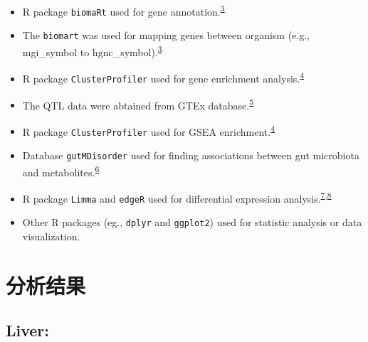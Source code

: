\documentclass[
]{article}
\providecommand{\tightlist}{%
  \setlength{\itemsep}{0pt}\setlength{\parskip}{0pt}}
\begin{document}
\begin{itemize}
\tightlist
\item
  R package \texttt{biomaRt} used for gene annotation.\textsuperscript{\protect\hyperlink{ref-MappingIdentifDurinc2009}{3}}
\item
  The \texttt{biomart} was used for mapping genes between organism (e.g., mgi\_symbol to hgnc\_symbol).\textsuperscript{\protect\hyperlink{ref-MappingIdentifDurinc2009}{3}}
\item
  R package \texttt{ClusterProfiler} used for gene enrichment analysis.\textsuperscript{\protect\hyperlink{ref-ClusterprofilerWuTi2021}{4}}
\item
  The QTL data were abtained from GTEx database.\textsuperscript{\protect\hyperlink{ref-TheGtexConsorNone2020}{5}}
\item
  R package \texttt{ClusterProfiler} used for GSEA enrichment.\textsuperscript{\protect\hyperlink{ref-ClusterprofilerWuTi2021}{4}}
\item
  Database \texttt{gutMDisorder} used for finding associations between gut microbiota and metabolites.\textsuperscript{\protect\hyperlink{ref-GutmdisorderACheng2019}{6}}
\item
  R package \texttt{Limma} and \texttt{edgeR} used for differential expression analysis.\textsuperscript{\protect\hyperlink{ref-LimmaPowersDiRitchi2015}{7},\protect\hyperlink{ref-EdgerDifferenChen}{8}}
\item
  Other R packages (eg., \texttt{dplyr} and \texttt{ggplot2}) used for statistic analysis or data visualization.
\end{itemize}

\hypertarget{results}{%
\section{分析结果}\label{results}}

\hypertarget{liver}{%
\subsection{Liver:}\label{liver}}
\end{document}
